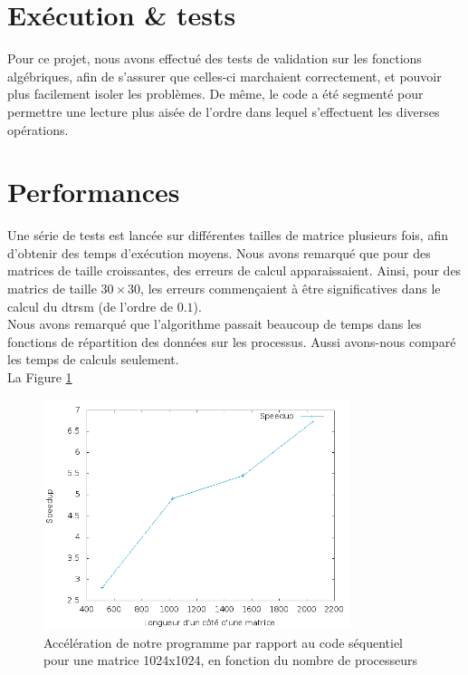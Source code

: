\section{Exécution \& tests} %
\label{sec:execution}

Pour ce projet, nous avons effectué des tests de validation sur les fonctions algébriques, afin de s'assurer que celles-ci marchaient correctement, et pouvoir plus facilement isoler les problèmes. 
De même, le code a été segmenté pour permettre une lecture plus aisée de l'ordre dans lequel s'effectuent les diverses opérations.

\section{Performances} %
\label{sec:perf}

Une série de tests est lancée sur différentes tailles de matrice plusieurs fois, afin d'obtenir des temps d'exécution moyens. Nous avons remarqué que pour des matrices de taille croissantes, des erreurs de calcul apparaissaient. Ainsi, pour des matrics de taille $30 \times 30$, les erreurs commençaient à être significatives dans le calcul du dtrsm (de l'ordre de $0.1$).\\
Nous avons remarqué que l'algorithme passait beaucoup de temps dans les fonctions de répartition des données sur les processus. Aussi avons-nous comparé les temps de calculs seulement. \\
La Figure \ref{fig:sp-size} 

\begin{figure}[H]
\centering
\includegraphics[width=0.8\textwidth]{sp-size.png}
\caption{Accélération de notre programme par rapport au code séquentiel pour une matrice 1024x1024, en fonction du nombre de processeurs}
\label{fig:sp-size}
\end{figure}

